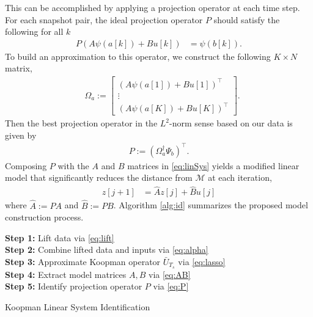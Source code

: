 This can be accomplished by applying a projection operator at each time step.
For each snapshot pair, the ideal projection operator $P$ should satisfy the following for all $k$
\begin{align}
    P \left( A {\psi}(a[k]) + B u[k] \right) &= \psi(b[k]).
\end{align}
To build an approximation to this operator, we construct the following $K \times N$ matrix,
\begin{align}
    &\Omega_a := \begin{bmatrix} \left( A {\psi}(a[1]) + B u[1] \right)^\top \\ \vdots \\  \left( A {\psi}(a[K]) + B u[K] \right)^\top \end{bmatrix}.
    \label{eq:Omega}
\end{align}
Then the best projection operator in the $L^2$-norm sense based on our data is given by
\begin{align}
    P := \left( \Omega_{a}^\dagger \Psi_b \right)^\top.
    \label{eq:P}
\end{align}
Composing $P$ with the $A$ and $B$ matrices in \eqref{eq:linSys} yields a modified linear model that significantly reduces the distance from $\mathcal{M}$ at each iteration,
\begin{align}
    z[j+1] &= \hat{A} z[j] + \hat{B} u[j]
    \label{eq:linSys_wP}
\end{align}
where $\hat{A} := PA$ and  $\hat{B} := PB$.
Algorithm \ref{alg:id} summarizes the proposed model construction process.


\begin{algorithm}[t]
\SetAlgoLined
{}
\textbf{Step 1:} Lift data via \eqref{eq:lift} \\
\textbf{Step 2:} Combine lifted data and inputs via \eqref{eq:alpha} \\
\textbf{Step 3:} Approximate Koopman operator $\bar{U}_{T_s}$ via \eqref{eq:lasso} \\
\textbf{Step 4:} Extract model matrices $A,B$ via \eqref{eq:AB} \\
\textbf{Step 5:} Identify projection operator $P$ via \eqref{eq:P} \\
 \caption{Koopman Linear System Identification}
 \label{alg:id}
\end{algorithm}